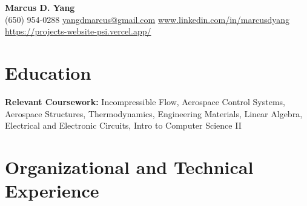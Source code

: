 \newcommand{\entrygap}{\vspace{2pt}}



\begin{center}
  {\fontsize{17}{20}\selectfont\bfseries Marcus D. Yang}\\[2pt]
  {\footnotesize (650) 954-0288 \textbar{} \href{mailto:yangdmarcus@gmail.com}{yangdmarcus@gmail.com} \textbar{} \href{https://www.linkedin.com/in/marcusdyang}{www.linkedin.com/in/marcusdyang} \textbar{} \href{https://projects-website-psi.vercel.app/}{https://projects-website-psi.vercel.app/}}
\end{center}

\section{Education}
\textbf{Relevant Coursework:} Incompressible Flow, Aerospace Control Systems, Aerospace Structures, Thermodynamics, Engineering Materials, Linear Algebra, Electrical and Electronic Circuits, Intro to Computer Science II

\section{Organizational and Technical Experience}

